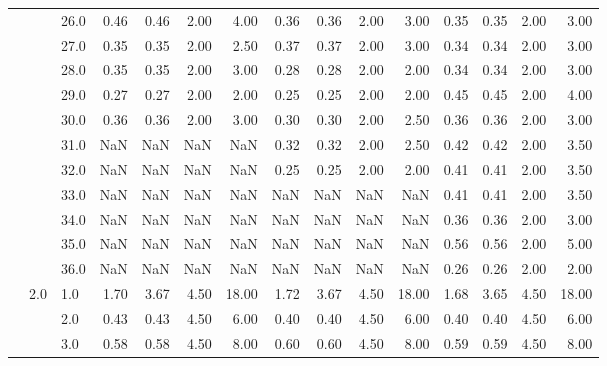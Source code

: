 \begin{tabular}{lllrrrrrrrrrrrr}
       &     & 26.0 &       0.46 &      0.46 & 2.00 &   4.00 &       0.36 &      0.36 & 2.00 &   3.00 &       0.35 &      0.35 & 2.00 &   3.00 \\
       &     & 27.0 &       0.35 &      0.35 & 2.00 &   2.50 &       0.37 &      0.37 & 2.00 &   3.00 &       0.34 &      0.34 & 2.00 &   3.00 \\
       &     & 28.0 &       0.35 &      0.35 & 2.00 &   3.00 &       0.28 &      0.28 & 2.00 &   2.00 &       0.34 &      0.34 & 2.00 &   3.00 \\
       &     & 29.0 &       0.27 &      0.27 & 2.00 &   2.00 &       0.25 &      0.25 & 2.00 &   2.00 &       0.45 &      0.45 & 2.00 &   4.00 \\
       &     & 30.0 &       0.36 &      0.36 & 2.00 &   3.00 &       0.30 &      0.30 & 2.00 &   2.50 &       0.36 &      0.36 & 2.00 &   3.00 \\
       &     & 31.0 &        NaN &       NaN &  NaN &    NaN &       0.32 &      0.32 & 2.00 &   2.50 &       0.42 &      0.42 & 2.00 &   3.50 \\
       &     & 32.0 &        NaN &       NaN &  NaN &    NaN &       0.25 &      0.25 & 2.00 &   2.00 &       0.41 &      0.41 & 2.00 &   3.50 \\
       &     & 33.0 &        NaN &       NaN &  NaN &    NaN &        NaN &       NaN &  NaN &    NaN &       0.41 &      0.41 & 2.00 &   3.50 \\
       &     & 34.0 &        NaN &       NaN &  NaN &    NaN &        NaN &       NaN &  NaN &    NaN &       0.36 &      0.36 & 2.00 &   3.00 \\
       &     & 35.0 &        NaN &       NaN &  NaN &    NaN &        NaN &       NaN &  NaN &    NaN &       0.56 &      0.56 & 2.00 &   5.00 \\
       &     & 36.0 &        NaN &       NaN &  NaN &    NaN &        NaN &       NaN &  NaN &    NaN &       0.26 &      0.26 & 2.00 &   2.00 \\
       & 2.0 & 1.0  &       1.70 &      3.67 & 4.50 &  18.00 &       1.72 &      3.67 & 4.50 &  18.00 &       1.68 &      3.65 & 4.50 &  18.00 \\
       &     & 2.0  &       0.43 &      0.43 & 4.50 &   6.00 &       0.40 &      0.40 & 4.50 &   6.00 &       0.40 &      0.40 & 4.50 &   6.00 \\
       &     & 3.0  &       0.58 &      0.58 & 4.50 &   8.00 &       0.60 &      0.60 & 4.50 &   8.00 &       0.59 &      0.59 & 4.50 &   8.00 \\

\end{tabular}
